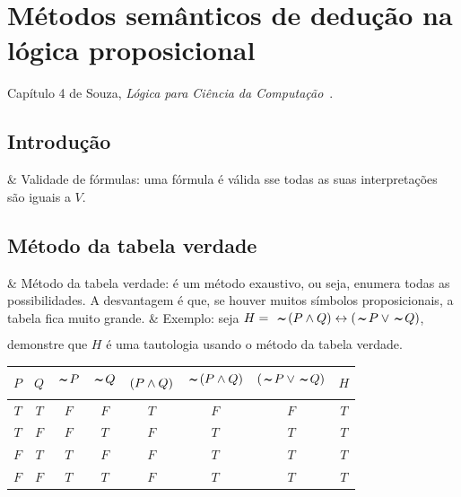 \chapter{Métodos semânticos de dedução na lógica proposicional}


Capítulo 4 de Souza, \textit{Lógica para Ciência da Computação}~\cite{souza_logica_3}.

\vspace{1cm}


\section{Introdução}

\begin{easylist}
  & Validade de fórmulas: uma fórmula é válida sse todas as suas interpretações são iguais a $V$.
\end{easylist}


\section{Método da tabela verdade}

\begin{easylist}
  & Método da tabela verdade: é um método exaustivo, ou seja, enumera todas as possibilidades. A desvantagem é que, se houver muitos símbolos proposicionais, a tabela fica muito grande.
  & Exemplo: seja $H = \; \NOT(P \AND Q) \BIC (\NOT P \OR \NOT Q)$, demonstre que $H$ é uma tautologia usando o método da tabela verdade.  
\end{easylist}

\begin{center}
  \begin{tabular}{ c|c|c|c|c|c|c|c }
    $P$ & $Q$ & $\NOT P$ & $\NOT Q$ & $(P \land Q)$ & $\NOT(P \AND Q)$ & $(\NOT P \OR \NOT Q)$ & $H$ \\
    \hline
    $T$ & $T$ & $F$      & $F$      & $T$          & $F$              & $F$                   & $T$ \\
    $T$ & $F$ & $F$      & $T$      & $F$          & $T$              & $T$                   & $T$ \\
    $F$ & $T$ & $T$      & $F$      & $F$          & $T$              & $T$                   & $T$ \\
    $F$ & $F$ & $T$      & $T$      & $F$          & $T$              & $T$                   & $T$ \\
  \end{tabular}
\end{center}

